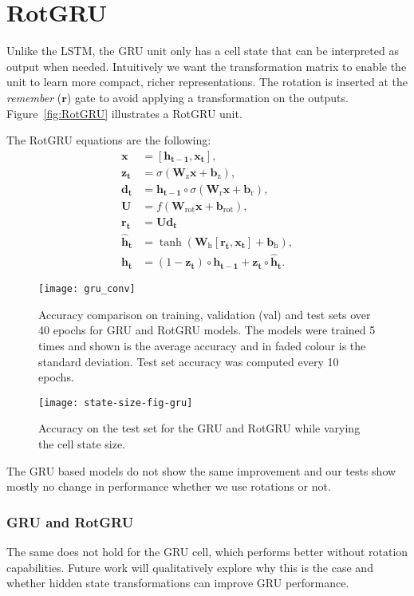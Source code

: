 \section{RotGRU}

Unlike the LSTM, the \ac{GRU} unit only has a cell state that can be interpreted as output when needed. Intuitively we want the transformation matrix to enable the unit to learn more compact, richer representations. The rotation is inserted at the \emph{remember} ($\mathbf{r}$) gate to avoid applying a transformation on the outputs. Figure~\ref{fig:RotGRU} illustrates a RotGRU unit.

The RotGRU equations are the following:
\begin{align}
	\mathbf{x} &= [\mathbf{h_{t-1}},  \mathbf{x_t}], \\
	\mathbf{z_t} &= \sigma(\bm{W}_{\text{z}} \mathbf{x} + \mathbf{b}_\text{z}), \\
	\mathbf{d_t} &= \mathbf{h_{t-1}} \circ \sigma(\bm{W}_{\text{r}} \mathbf{x} + \mathbf{b}_\text{r}), \\
	\bm{U} &= f(\bm{W}_{\text{rot}} \mathbf{x} + \mathbf{b}_\text{rot}), \\
	\mathbf{r_t} &= \bm{U}\mathbf{d_t} \\
	\mathbf{\hat{h}_t} &= \tanh(\bm{W}_\text{h}[\mathbf{r_t}, \mathbf{x_t}] + \mathbf{b}_\text{h}), \\
	\mathbf{\mathbf{h}_t} &= (1-\mathbf{z_t}) \circ \mathbf{h_{t-1}} + \mathbf{z_t} \circ \mathbf{\hat{h}_t}.
\end{align}


\begin{figure}[h]
\begin{center}
\texttt{[image: gru\_conv]}
\end{center}
\caption{Accuracy comparison on training, validation (val) and test sets over 40 epochs for GRU and RotGRU models. The models were trained 5 times and shown is the average accuracy and in faded colour is the standard deviation. Test set accuracy was computed every 10 epochs.}
\label{fig:gru_converge}
\end{figure}

\begin{figure}[h]
\begin{center}
\texttt{[image: state-size-fig-gru]}
\end{center}
\caption{Accuracy on the test set for the GRU and RotGRU while varying the cell state size.}
\label{fig:state-size-fig-gru}
\end{figure}


 The GRU based models do not show the same improvement and our tests show mostly no change in performance whether we use rotations or not.
 \subsubsection{GRU and RotGRU}

 The same does not hold for the GRU cell, which performs better without rotation capabilities. Future work will qualitatively explore why this is the case and whether hidden state transformations can improve GRU performance.
